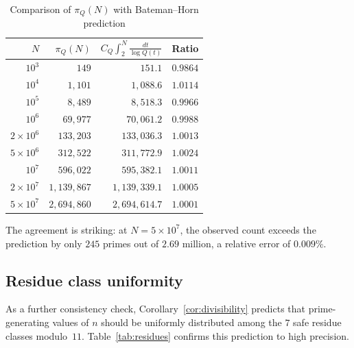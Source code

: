 \documentclass[11pt,a4paper]{article}
\theoremstyle{plain}
\theoremstyle{definition}
\theoremstyle{remark}
\begin{document}
\begin{table}[ht]
\centering
\caption{Comparison of $\pi_Q(N)$ with Bateman--Horn prediction}
\label{tab:BH}
\smallskip
\begin{tabular}{@{}rrrr@{}}
\toprule
$N$ & $\pi_Q(N)$ & $C_Q \int_2^N \frac{dt}{\log Q(t)}$ & Ratio \\
\midrule
$10^3$           &         $149$ &       $151.1$ & $0.9864$ \\
$10^4$           &       $1{,}101$ &     $1{,}088.6$ & $1.0114$ \\
$10^5$           &       $8{,}489$ &     $8{,}518.3$ & $0.9966$ \\
$10^6$           &      $69{,}977$ &    $70{,}061.2$ & $0.9988$ \\
$2\times 10^6$   &     $133{,}203$ &   $133{,}036.3$ & $1.0013$ \\
$5\times 10^6$   &     $312{,}522$ &   $311{,}772.9$ & $1.0024$ \\
$10^7$           &     $596{,}022$ &   $595{,}382.1$ & $1.0011$ \\
$2\times 10^7$   &   $1{,}139{,}867$ & $1{,}139{,}339.1$ & $1.0005$ \\
$5\times 10^7$   &   $2{,}694{,}860$ & $2{,}694{,}614.7$ & $1.0001$ \\
\bottomrule
\end{tabular}
\end{table}

The agreement is striking: at $N = 5 \times 10^7$, the observed count exceeds the prediction by only $245$ primes out of $2.69$ million, a relative error of $0.009\%$.


\subsection{Residue class uniformity}

As a further consistency check, Corollary~\ref{cor:divisibility} predicts that prime-generating values of $n$ should be uniformly distributed among the $7$ safe residue classes modulo~$11$. Table~\ref{tab:residues} confirms this prediction to high precision.
\end{document}
